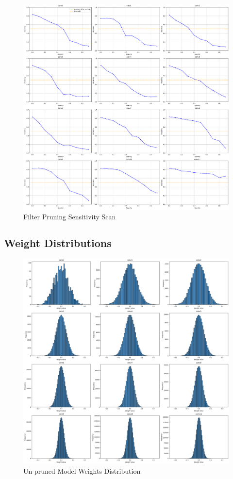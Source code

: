 \documentclass[12pt]{article}
\begin{document}
\begin{figure}[h]
  \centering
  \includegraphics[width=1\linewidth]{report_images/sense_filter.png}
  \caption{\label{fig:sense_filter}Filter Pruning Sensitivity Scan}
\end{figure}
\FloatBarrier
\pagebreak

\subsection{Weight Distributions} 

\label{weight_distribution}
\begin{figure}[h]
  \centering
  \includegraphics[width=1\linewidth]{report_images/unpruned_dist.png}
  \caption{\label{fig:unpruned_dist}Un-pruned Model Weights Distribution}
\end{figure}
\FloatBarrier
\end{document}

